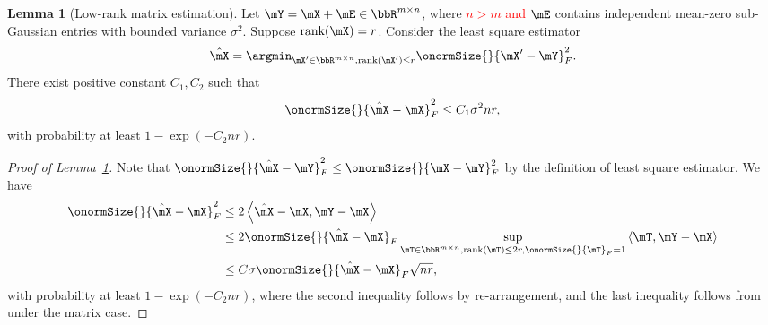 \documentclass[lettersize,onecolumn,journal]{IEEEtran}
\theoremstyle{definition}
\newtheorem{lem}{Lemma}
\theoremstyle{definition}
\newcommand{\ang}[1]{\left\langle#1\right\rangle}
\begin{document}
{
\color{blue}
\begin{lem}[Low-rank matrix estimation] \label{lem:lowrank} Let $\mY = \mX + \mE \in \bbR^{m \times n}$, where \textcolor{red}{$n > m$ and}  $\mE$ contains independent mean-zero sub-Gaussian entries with bounded variance $\sigma^2$. Suppose $\text{rank}(\mX) = r$. Consider the least square estimator 
        \begin{equation}
            \hat \mX = \argmin_{\mX' \in \bbR^{m \times n}, \text{rank}(\mX') \leq r} \onormSize{}{\mX' - \mY}_F^2.
        \end{equation}
        There exist positive constant $C_1, C_2$ such that
        \begin{equation}
            \onormSize{}{\hat \mX - \mX}_F^2 \leq C_1 \sigma^2 nr,
        \end{equation}
        with probability at least $1 - \exp(-C_2 nr)$.

        \end{lem}

\begin{proof}[Proof of Lemma~\ref{lem:lowrank}] Note that $\onormSize{}{\hat \mX - \mY}_F^2 \leq \onormSize{}{\mX - \mY}_F^2$ by the definition of least square estimator. We have 
        \begin{align}
            \onormSize{}{\hat \mX - \mX}_F^2 & \leq 2 \ang{ \hat \mX - \mX, \mY - \mX} \\ & \leq 2 \onormSize{}{\hat \mX - \mX}_F \sup_{\mT \in \bbR^{m \times n}, \text{rank}(\mT) \leq 2r, \onormSize{}{\mT}_F = 1} \ang{\mT, \mY - \mX} \\
            & \leq C \sigma  \onormSize{}{\hat \mX - \mX}_F \sqrt{nr},
        \end{align}
        with probability at least $1 - \exp(-C_2 nr)$, where the second inequality follows by re-arrangement, and the last inequality follows from \citet[Lemma E5]{han2022optimal} under the matrix case.
        

\end{proof}}
\end{document}
